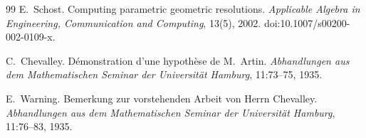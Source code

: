 \documentclass[11pt,a4paper]{article}
\theoremstyle{definition}
\theoremstyle{remark}
\begin{document}
\begin{thebibliography}{99}
E.~Schost.
\newblock Computing parametric geometric resolutions.
\newblock \emph{Applicable Algebra in Engineering, Communication and Computing}, 13(5), 2002.
\newblock doi:10.1007/s00200-002-0109-x.

C.~Chevalley.
\newblock D\'emonstration d'une hypoth\`ese de M.~Artin.
\newblock \emph{Abhandlungen aus dem Mathematischen Seminar der Universit\"at Hamburg}, 11:73--75, 1935.

E.~Warning.
\newblock Bemerkung zur vorstehenden Arbeit von Herrn Chevalley.
\newblock \emph{Abhandlungen aus dem Mathematischen Seminar der Universit\"at Hamburg}, 11:76--83, 1935.

\end{thebibliography}
\end{document}

